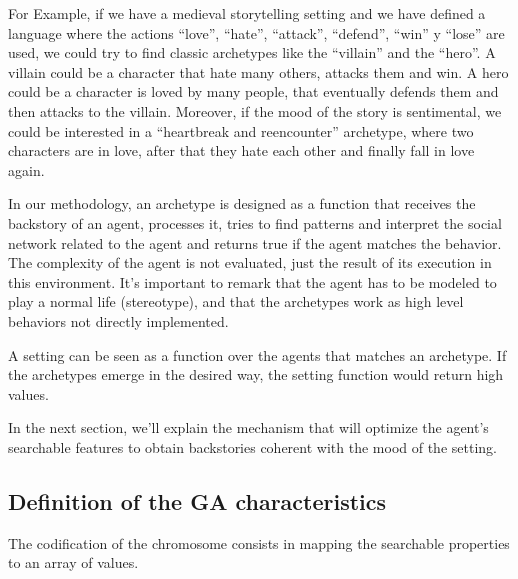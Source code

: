 \documentclass{sig-alternate}
\begin{document}
For Example, if we have a medieval storytelling setting and we have defined a language where the actions ``love'', ``hate'', ``attack'', ``defend'', ``win'' y ``lose'' are used, we could try to find classic 
archetypes like the ``villain'' and the ``hero''. A villain could be a character that hate many others, attacks them and win. A hero could be a character is loved by many people, that eventually defends them and then attacks to the villain. Moreover, if the mood of the story is sentimental, we could be interested in a ``heartbreak and reencounter'' archetype, where two characters are in love, after that they hate each other and finally fall in love again.

In our methodology, an archetype is designed as a function that receives the backstory of an agent, processes it, tries to find patterns and interpret the social network related to the agent and returns true if the agent matches the behavior. 
The complexity of the agent is not evaluated, just the result of its execution in this environment. It's important to remark that the agent has to be modeled to play a normal life (stereotype), and that the archetypes work as high level behaviors not directly implemented.

A setting can be seen as a function over the agents that matches an archetype. If the archetypes emerge in the desired way, the setting function would return high values.

In the next section, we'll explain the mechanism that will optimize the agent's searchable features to obtain backstories coherent with the mood of the setting.

\subsection{Definition of the GA characteristics}


The codification of the chromosome consists in mapping the searchable properties to an array of values. %
\end{document}
